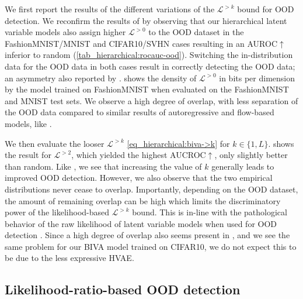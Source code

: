 {We first report the results of the different variations of the $\mathcal{L}^{>k}$ bound for OOD detection. 
We reconfirm the results of \textcite{nalisnick_deep_2019} by observing that our hierarchical latent variable models also assign higher $\mathcal{L}^{>0}$ to the OOD dataset in the FashionMNIST/MNIST and CIFAR10/SVHN cases resulting in an AUROC$\uparrow$ inferior to random (\cref{tab_hierarchical:rocauc-ood}).
Switching the in-distribution data for the OOD data in both cases result in correctly detecting the OOD data; an asymmetry also reported by \textcite{nalisnick_deep_2019}.
 shows the density of $\mathcal{L}^{>0}$ in bits per dimension \parencite{theis_note_2016} by the model trained on FashionMNIST when evaluated on the FashionMNIST and MNIST test sets.
We observe a high degree of overlap, with less separation of the OOD data compared to similar results of autoregressive and flow-based models, like \textcite{xiao_likelihood_2020}.


We then evaluate the looser $\mathcal{L}^{>k}$ \cref{eq_hierarchical:biva->k} for $k\in\{1,L\}$.
 shows the result for $\mathcal{L}^{>2}$, which yielded the highest AUCROC$\uparrow$, only slightly better than random.
Like \textcite{maaloe_biva_2019}, we see that increasing the value of $k$ generally leads to improved OOD detection.
However, we also observe that the two empirical distributions never cease to overlap.
Importantly, depending on the OOD dataset, the amount of remaining overlap can be high which limits the discriminatory power of the likelihood-based $\mathcal{L}^{>k}$ bound.
This is in-line with the pathological behavior of the raw likelihood of latent variable models when used for OOD detection \parencite{xiao_likelihood_2020}.
Since a high degree of overlap also seems present in \textcite{maaloe_biva_2019}, and we see the same problem for our BIVA model trained on CIFAR10, we do not expect this to be due to the less expressive HVAE.


\subsection{Likelihood-ratio-based OOD detection}

}
